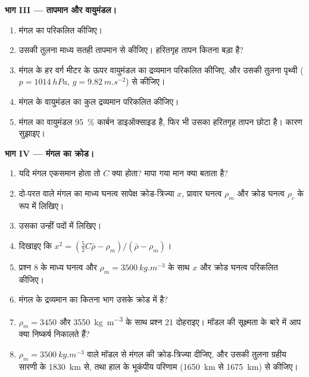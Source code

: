 \begin{problem}
\medskip
\noindent\textbf{भाग III --- तापमान और वायुमंडल।}
\begin{enumerate}[resume]
  \item मंगल का  परिकलित कीजिए।
  \item उसकी तुलना माध्य सतही तापमान से कीजिए। हरितगृह तापन कितना बड़ा है?
  \item मंगल के हर वर्ग मीटर के ऊपर वायुमंडल का द्रव्यमान परिकलित कीजिए, और उसकी तुलना पृथ्वी ($p = \qty{1014}{hPa}$,
        $g = \qty{9.82}{m.s^{-2}}$) से कीजिए।
  \item मंगल के वायुमंडल का कुल द्रव्यमान परिकलित कीजिए।
  \item मंगल का वायुमंडल \qty{95}{\percent} कार्बन डाइऑक्साइड है, फिर भी उसका हरितगृह तापन छोटा है। कारण सुझाइए।
\end{enumerate}

\medskip
\noindent\textbf{भाग IV --- मंगल का क्रोड।}
\begin{enumerate}[resume]
  \item यदि मंगल एकसमान होता तो $C$ क्या होता? मापा गया मान क्या बताता है?
  \item दो-परत वाले मंगल का माध्य घनत्व सापेक्ष क्रोड-त्रिज्या $x$, प्रावार घनत्व $\rho_m$ और क्रोड घनत्व
        $\rho_c$ के रूप में लिखिए।
  \item उसका  उन्हीं पदों में लिखिए।
  \item दिखाइए कि $x^2 = (\tfrac52C\bar\rho - \rho_m)/(\bar\rho - \rho_m)$।
  \item प्रश्न 8 के माध्य घनत्व और $\rho_m =
        \qty{3500}{kg.m^{-3}}$ के साथ $x$ और क्रोड घनत्व परिकलित कीजिए।
  \item मंगल के द्रव्यमान का कितना भाग उसके क्रोड में है?
  \item $\rho_m = 3450$ और \qty{3550}{kg.m^{-3}} के साथ प्रश्न 21 दोहराइए। मॉडल की सूक्ष्मता के बारे में आप क्या निष्कर्ष निकालते हैं?
  \item $\rho_m = \qty{3500}{kg.m^{-3}}$ वाले मॉडल से मंगल की क्रोड-त्रिज्या दीजिए, और उसकी तुलना ग्रहीय सारणी के \qty{1830}{km} से, तथा हाल के भूकंपीय परिणाम (\qty{1650}{km} से \qty{1675}{km}) से कीजिए।
\end{enumerate}
\end{problem}
